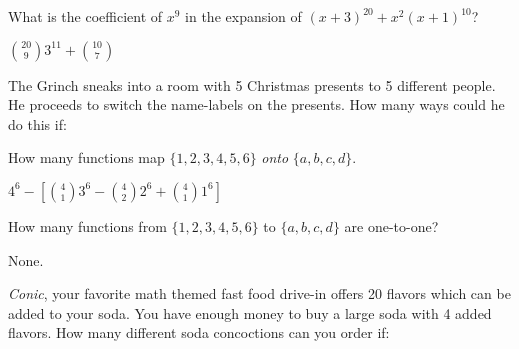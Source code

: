 \begin{squestions}
\question What is the coefficient of $x^9$ in the expansion of $(x+3)^{20} + x^2(x+1)^{10}$?

  \begin{answer}
   ${20 \choose 9}3^{11} + {10 \choose 7}$
  \end{answer}


\question The Grinch sneaks into a room with 5 Christmas presents to 5 different people.  He proceeds to switch the name-labels on the presents.  How many ways could he do this if:

  \begin{answer}
  \end{answer}


\question How many functions map $\{1,2,3,4,5,6\}$ {\em onto} $\{a,b,c,d\}$.

 \begin{answer}
  $4^6 - \left[{4 \choose 1}3^6 - {4 \choose 2} 2^6 + {4 \choose 1}1^6\right]$
 \end{answer}


\question How many functions from $\{1, 2, 3, 4, 5, 6\}$ to $\{a,b,c,d\}$ are one-to-one?

  \begin{answer}
   None.
  \end{answer}


\question \textit{Conic}, your favorite math themed fast food drive-in offers 20 flavors which can be added to your soda.  You have enough money to buy a large soda with 4 added flavors.  How many different soda concoctions can you order if:
\begin{parts}

\end{parts}
\end{squestions}
